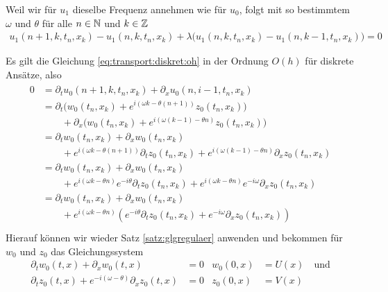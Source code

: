 Weil wir für $u_1$ dieselbe Frequenz annehmen wie für $u_0$, folgt mit so bestimmtem $\omega$ und $\theta$ für alle $n \in \mathbb N$ und $k \in \mathbb Z$
\begin{align}\label{eq:wkb:bed1}
u_1(n+1,k,t_n,x_k) - u_1(n,k,t_n,x_k) + \lambda \bigl(u_1(n,k,t_n,x_k) - u_1(n,k-1,t_n,x_k) \bigr) = 0
\end{align}

Es gilt die Gleichung \eqref{eq:transport:diskret:oh} in der Ordnung $O(h)$ für diskrete Ansätze, also
\begin{align}\begin{split}
0 &= \partial_t u_0(n+1, k, t_n, x_k) + \partial_x u_0(n, i-1, t_n, x_k)\\
&= \partial_t \bigl( w_0(t_n, x_k) + e^{i (\omega k - \theta (n+1))} z_0(t_n, x_k) \bigr)\\
&\qquad + \partial_x \bigl(  w_0(t_n, x_k) + e^{i (\omega (k-1) - \theta n)} z_0(t_n, x_k)\bigr)\\
&= \partial_t w_0(t_n, x_k) + \partial_x w_0(t_n, x_k) \\
&\qquad + e^{i (\omega k - \theta (n+1))} \partial_t z_0(t_n, x_k) + e^{i (\omega (k-1) - \theta n)} \partial_x z_0(t_n, x_k)\\
&= \partial_t w_0(t_n, x_k) + \partial_x w_0(t_n, x_k) \\
&\qquad + e^{i (\omega k - \theta n)} e^{- i \theta} \partial_t z_0(t_n, x_k) + e^{i (\omega k - \theta n)} e^{-i \omega} \partial_x z_0(t_n, x_k)\\
&= \partial_t w_0(t_n, x_k) + \partial_x w_0(t_n, x_k) \\
&\qquad + e^{i (\omega k - \theta n)}  \left( e^{- i \theta} \partial_t z_0(t_n, x_k) + e^{-i \omega} \partial_x z_0(t_n, x_k) \right)\\
\end{split}\end{align}
Hierauf können wir wieder Satz \ref{satz:glgregulaer} anwenden und bekommen für $w_0$ und $z_0$ das Gleichungssystem
\begin{align}\label{eq:exp:oh}
\partial_t w_0(t,x) + \partial_x w_0(t,x) &= 0 &w_0(0,x) &= U(x) \quad \text{und}\\
\partial_t z_0(t,x) + e^{-i (\omega - \theta)} \partial_x z_0(t,x) &= 0 &z_0(0,x) &= V(x) 
\end{align}

